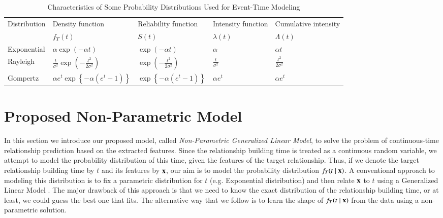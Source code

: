 \begin{table*}
	\centering
	\caption{Characteristics of Some Probability Distributions Used for Event-Time Modeling}
	\label{table:dists}
	\begin{tabu} to \textwidth {X X[c] X[c] X[c] X[c]}
		\toprule
		Distribution & Density function & Reliability function & Intensity function & Cumulative intensity\\
		& $f_T(t)$ & $S(t)$ & $\lambda(t)$ & $\Lambda(t)$\\[1pt]
		\midrule %
		Exponential & $\alpha\exp(-\alpha t)$ & $\exp(-\alpha t)$ & $\alpha$ & $\alpha t$\\[4pt]
		Rayleigh & $\frac{t}{\sigma^2}\exp(-\frac{t^2}{2\sigma^2})$ & $\exp(-\frac{t^2}{2\sigma^2})$ & $\frac{t}{\sigma^2}$ & $\frac{t^2}{2\sigma^2}$\\[4pt]
		Gompertz & $\alpha e^t\exp\left\lbrace -\alpha(e^t-1) \right\rbrace$ & $\exp\left\lbrace -\alpha(e^t-1) \right\rbrace$ & $\alpha e^t$ & $\alpha e^t$\\[2pt]
		\bottomrule %
	\end{tabu}
\end{table*}

\section{Proposed Non-Parametric Model}\label{sec:method}
In this section we introduce our proposed model, called \emph{Non-Parametric Generalized Linear Model}, to solve the problem of continuous-time relationship prediction based on the extracted features. 
Since the relationship building time is treated as a continuous random variable, we attempt to model the probability distribution of this time, given the features of the target relationship. Thus, if we denote the target relationship building time by $t$ and its features by $\mathbf{x}$, our aim is to model the probability distribution $f_T(t\mid \mathbf{x})$. A conventional approach to modeling this distribution is to fix a parametric distribution for $t$ (e.g. Exponential distribution) and then relate $\mathbf{x}$ to $t$ using a Generalized Linear Model \cite{sun2012will}. The major drawback of this approach is that we need to know the exact distribution of the relationship building time, or at least, we could guess the best one that fits. The alternative way that we follow is to learn the shape of $f_T(t\mid \mathbf{x})$ from the data using a non-parametric solution.


